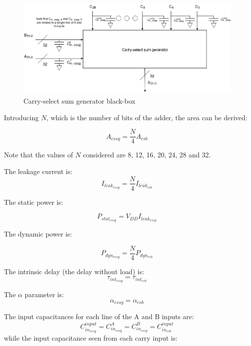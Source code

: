 \begin{figure}[H]
\centering
\includegraphics[width = 10 cm, height = 6 cm]{pentium/carry_select_sum_generator_black_box.png}
\caption{Carry-select sum generator black-box}
\label{fig:cssg_bb}
\end{figure}

Introducing $N$, which is the number of bits of the adder, the area can be derived:

\begin{equation}
A_{cssg} = \frac{N}{4} A_{csb}
\end{equation}

Note that the values of $N$ considered are 8, 12, 16, 20, 24, 28 and 32.

The leakage current is:
\begin{equation}
I_{leak_{cssg}} = \frac{N}{4} I_{leak_{csb}}
\end{equation}

The static power is:

\begin{equation}
P_{stat_{cssg}} = V_{DD} I_{leak_{cssg}}
\end{equation}

The dynamic power is:

\begin{equation}
P_{dyn_{cssg}} = \frac{N}{4} P_{dyn_{csb}}
\end{equation}

The intrinsic delay (the delay without load) is:
\begin{equation}
\tau_{int_{cssg}} = \tau_{int_{csb}}
\end{equation}

The $\alpha$ parameter is:
\begin{equation}
\alpha_{cssg} = \alpha_{csb}
\end{equation}

The input capacitances for each line of the A and B inputs are:
\begin{equation}
C_{in_{cssg}}^{input} = C_{in_{cssg}}^{A} = C_{in_{cssg}}^{B} = C_{in_{csb}}^{input}
\end{equation}
while the input capacitance seen from each carry input is:

